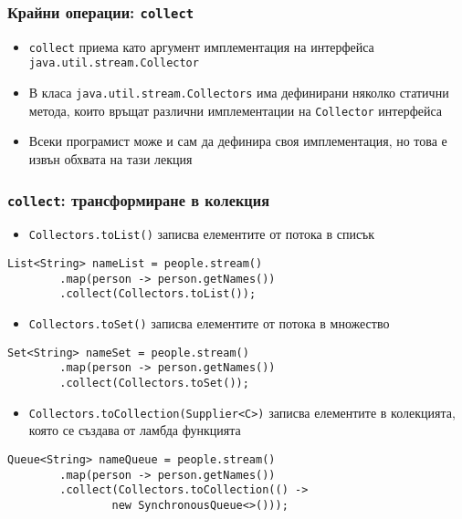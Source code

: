 \documentclass[ignorenonframetext, hyperref=unicode,compress,pdflatex]{beamer}
\begin{document}
\begin{frame}[containsverbatim]\frametitle{Крайни операции:
\lstinline{collect}}
\begin{itemize}
  \item \lstinline{collect} приема като аргумент имплементация на интерфейса
  \lstinline{java.util.stream.Collector}
  \item В класа \lstinline{java.util.stream.Collectors} има дефинирани няколко
  статични метода, които връщат различни имплементации на \lstinline{Collector}
  интерфейса
  \item Всеки програмист може и сам да дефинира своя имплементация, но това е
  извън обхвата на тази лекция
\end{itemize}
\end{frame}

\begin{frame}[containsverbatim]\frametitle{\lstinline{collect}: трансформиране
в колекция}
\begin{itemize}
  \item \lstinline{Collectors.toList()} записва елементите от потока в
  списък
\end{itemize}
\begin{lstlisting}
List<String> nameList = people.stream()
		.map(person -> person.getNames())
		.collect(Collectors.toList());
\end{lstlisting}
\begin{itemize}
  \item \lstinline{Collectors.toSet()} записва елементите от потока в множество
\end{itemize}
\begin{lstlisting}
Set<String> nameSet = people.stream()
		.map(person -> person.getNames())
		.collect(Collectors.toSet());
\end{lstlisting}
\begin{itemize}
  \item \lstinline{Collectors.toCollection(Supplier<C>)} записва елементите в
  колекцията, която се създава от ламбда функцията
\end{itemize}
\begin{lstlisting}
Queue<String> nameQueue = people.stream()
		.map(person -> person.getNames())
		.collect(Collectors.toCollection(() ->
				new SynchronousQueue<>()));
\end{lstlisting}
\end{frame}
\end{document}
